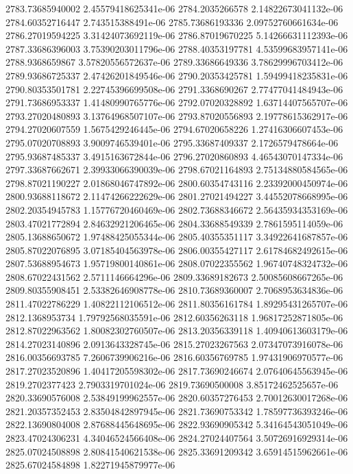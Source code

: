 {2783.73685940002 2.45579418625341e-06
2784.2035266578 2.14822673041132e-06
2784.60352716447 2.743515388491e-06
2785.73686193336 2.09752760661634e-06
2786.27019594225 3.31424073692119e-06
2786.87019670225 5.14266631112393e-06
2787.33686396003 3.75390203011796e-06
2788.40353197781 4.53599683957141e-06
2788.9368659867 3.57820556572637e-06
2789.33686649336 3.78629996703412e-06
2789.93686725337 2.47426201849546e-06
2790.20353425781 1.59499418235831e-06
2790.80353501781 2.22745396699508e-06
2791.3368690267 2.77477041484943e-06
2791.73686953337 1.41480990765776e-06
2792.07020328892 1.63714407565707e-06
2793.27020480893 3.13764968507107e-06
2793.87020556893 2.19778615362917e-06
2794.27020607559 1.5675429246445e-06
2794.67020658226 1.27416306607453e-06
2795.07020708893 3.9009746539401e-06
2795.33687409337 2.1726579478664e-06
2795.93687485337 3.4915163672844e-06
2796.27020860893 4.46543070147334e-06
2797.33687662671 2.39933066390039e-06
2798.67021164893 2.75134880584565e-06
2798.87021190227 2.01868046747892e-06
2800.60354743116 2.23392000450974e-06
2800.93688118672 2.11474266222629e-06
2801.27021494227 3.44552078668995e-06
2802.20354945783 1.15776720460469e-06
2802.73688346672 2.56435934353169e-06
2803.47021772894 2.84632921206465e-06
2804.33688549339 2.7861595114059e-06
2805.13688650672 1.97488425055344e-06
2805.40355351117 3.34922641687857e-06
2805.87022076895 3.07185404563978e-06
2806.00355427117 2.61784682492615e-06
2807.53688954673 1.95719800140861e-06
2808.07022355562 1.96740748324732e-06
2808.67022431562 2.5711146664296e-06
2809.33689182673 2.50085608667265e-06
2809.80355908451 2.53382646908778e-06
2810.73689360007 2.7068953634836e-06
2811.47022786229 1.40822112106512e-06
2811.80356161784 1.89295431265707e-06
2812.1368953734 1.79792568035591e-06
2812.60356263118 1.96817252871805e-06
2812.87022963562 1.80082302760507e-06
2813.20356339118 1.40940613603179e-06
2814.27023140896 2.0913643328745e-06
2815.27023267563 2.07347073916078e-06
2816.00356693785 7.2606739906216e-06
2816.60356769785 1.97431906970577e-06
2817.27023520896 1.40417205598302e-06
2817.73690246674 2.07640645563945e-06
2819.2702377423 2.7903319701024e-06
2819.73690500008 3.85172462525657e-06
2820.33690576008 2.53849199962557e-06
2820.60357276453 2.70012630017268e-06
2821.20357352453 2.83504842897945e-06
2821.73690753342 1.78597736393246e-06
2822.13690804008 2.87688445648695e-06
2822.93690905342 5.34164543051049e-06
2823.47024306231 4.34046524566408e-06
2824.27024407564 3.50726916929314e-06
2825.07024508898 2.80841540621538e-06
2825.33691209342 3.65914515962661e-06
2825.67024584898 1.82271945879977e-06
}
